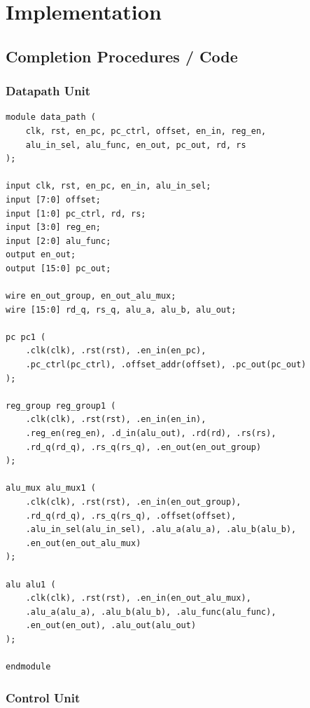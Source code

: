 \documentclass{article}
\begin{document}
\section{Implementation}

\subsection{Completion Procedures / Code}

\subsubsection{Datapath Unit}

\begin{lstlisting}[caption={Datapath Unit (data\_path.v)}, label={lst:datapath}]
module data_path (
    clk, rst, en_pc, pc_ctrl, offset, en_in, reg_en,
    alu_in_sel, alu_func, en_out, pc_out, rd, rs
);

input clk, rst, en_pc, en_in, alu_in_sel;
input [7:0] offset;
input [1:0] pc_ctrl, rd, rs;
input [3:0] reg_en;
input [2:0] alu_func;
output en_out;
output [15:0] pc_out;

wire en_out_group, en_out_alu_mux;
wire [15:0] rd_q, rs_q, alu_a, alu_b, alu_out;

pc pc1 (
    .clk(clk), .rst(rst), .en_in(en_pc),
    .pc_ctrl(pc_ctrl), .offset_addr(offset), .pc_out(pc_out)
);

reg_group reg_group1 (
    .clk(clk), .rst(rst), .en_in(en_in),
    .reg_en(reg_en), .d_in(alu_out), .rd(rd), .rs(rs),
    .rd_q(rd_q), .rs_q(rs_q), .en_out(en_out_group)
);

alu_mux alu_mux1 (
    .clk(clk), .rst(rst), .en_in(en_out_group),
    .rd_q(rd_q), .rs_q(rs_q), .offset(offset),
    .alu_in_sel(alu_in_sel), .alu_a(alu_a), .alu_b(alu_b),
    .en_out(en_out_alu_mux)
);

alu alu1 (
    .clk(clk), .rst(rst), .en_in(en_out_alu_mux),
    .alu_a(alu_a), .alu_b(alu_b), .alu_func(alu_func),
    .en_out(en_out), .alu_out(alu_out)
);

endmodule
\end{lstlisting}

\subsubsection{Control Unit}
\end{document}
